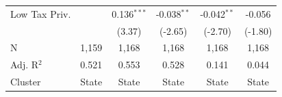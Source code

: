 \begin{tabular*}{\textwidth}{@{\extracolsep{\fill}}lccccc}
   Low Tax Priv.        &                & 0.136$^{***}$  & -0.038$^{**}$  & -0.042$^{**}$  & -0.056\\   
                        &                & (3.37)        & (-2.65)       & (-2.70)       & (-1.80)\\   
   \hline
   N         & 1,159          & 1,168          & 1,168          & 1,168          & 1,168\\  
   Adj. R$^2$       & 0.521          & 0.553          & 0.528          & 0.141          & 0.044\\  
   Cluster              & State & State & State & State & State\\  
   \bottomrule
\end{tabular*}
\par\endgroup
